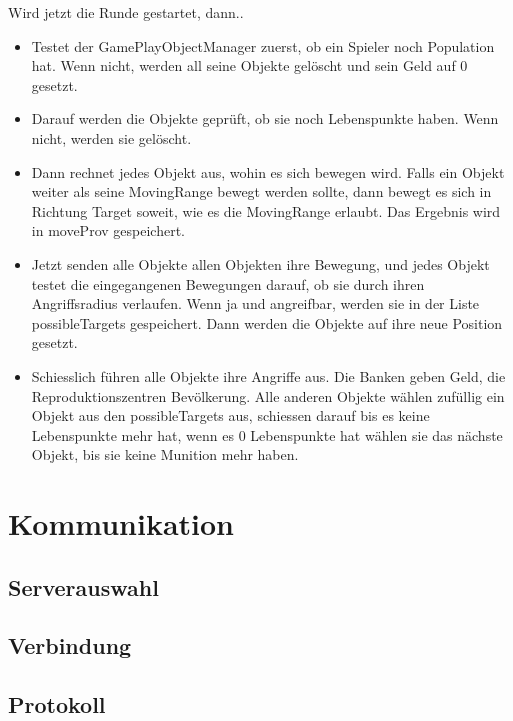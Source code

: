 \documentclass[ngerman, 12pt, pdftex]{scrartcl}[2006/07/30]
\begin{document}
Wird jetzt die Runde gestartet, dann..
\begin{itemize}

\item Testet der GamePlayObjectManager zuerst, ob ein Spieler noch Population hat. Wenn nicht, werden all seine Objekte gel\"{o}scht und sein Geld auf 0 gesetzt.
\item Darauf werden die Objekte gepr\"{u}ft, ob sie noch Lebenspunkte haben. Wenn nicht, werden sie gel\"{o}scht.
\item Dann rechnet jedes Objekt aus, wohin es sich bewegen wird. Falls ein Objekt weiter als seine MovingRange bewegt werden sollte, dann bewegt es sich in Richtung Target soweit, wie es die MovingRange erlaubt. Das Ergebnis wird in moveProv gespeichert.
\item Jetzt senden alle Objekte allen Objekten ihre Bewegung, und jedes Objekt testet die eingegangenen Bewegungen darauf, ob sie durch ihren Angriffsradius verlaufen. Wenn ja und angreifbar, werden sie in der Liste possibleTargets gespeichert. Dann werden die Objekte auf ihre neue Position gesetzt.
\item Schiesslich f\"{u}hren alle Objekte ihre Angriffe aus. Die Banken geben Geld, die Reproduktionszentren Bev\"{o}lkerung. Alle anderen Objekte w\"{a}hlen zuf\"{u}llig ein Objekt aus den possibleTargets aus, schiessen darauf bis es keine Lebenspunkte mehr hat, wenn es 0 Lebenspunkte hat w\"{a}hlen sie das n\"{a}chste Objekt, bis sie keine Munition mehr haben.
\end{itemize}



\section{Kommunikation}
\subsection{Serverauswahl}


\subsection{Verbindung}


\subsection{Protokoll}
\end{document}

